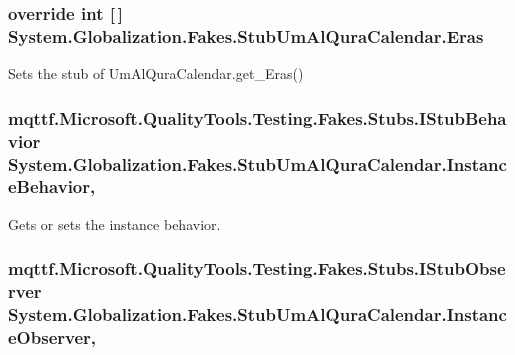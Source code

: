 \hypertarget{class_system_1_1_globalization_1_1_fakes_1_1_stub_um_al_qura_calendar_a76291ead9e535775a2084876057fe165}{
\subsubsection[{Eras}]{\setlength{\rightskip}{0pt plus 5cm}override int \mbox{[}$\,$\mbox{]} System.\-Globalization.\-Fakes.\-Stub\-Um\-Al\-Qura\-Calendar.\-Eras\hspace{0.3cm}{\ttfamily [get]}}}\label{class_system_1_1_globalization_1_1_fakes_1_1_stub_um_al_qura_calendar_a76291ead9e535775a2084876057fe165}


Sets the stub of Um\-Al\-Qura\-Calendar.\-get\-\_\-\-Eras()

\hypertarget{class_system_1_1_globalization_1_1_fakes_1_1_stub_um_al_qura_calendar_acab96834d402e150e91f18f103fd05d2}{
\subsubsection[{Instance\-Behavior}]{\setlength{\rightskip}{0pt plus 5cm}mqttf.\-Microsoft.\-Quality\-Tools.\-Testing.\-Fakes.\-Stubs.\-I\-Stub\-Behavior System.\-Globalization.\-Fakes.\-Stub\-Um\-Al\-Qura\-Calendar.\-Instance\-Behavior\hspace{0.3cm}{\ttfamily [get]}, {\ttfamily [set]}}}\label{class_system_1_1_globalization_1_1_fakes_1_1_stub_um_al_qura_calendar_acab96834d402e150e91f18f103fd05d2}


Gets or sets the instance behavior.

\hypertarget{class_system_1_1_globalization_1_1_fakes_1_1_stub_um_al_qura_calendar_aaeac9bee4b8be7bb39605f6272c69c87}{
\subsubsection[{Instance\-Observer}]{\setlength{\rightskip}{0pt plus 5cm}mqttf.\-Microsoft.\-Quality\-Tools.\-Testing.\-Fakes.\-Stubs.\-I\-Stub\-Observer System.\-Globalization.\-Fakes.\-Stub\-Um\-Al\-Qura\-Calendar.\-Instance\-Observer\hspace{0.3cm}{\ttfamily [get]}, {\ttfamily [set]}}}\label{class_system_1_1_globalization_1_1_fakes_1_1_stub_um_al_qura_calendar_aaeac9bee4b8be7bb39605f6272c69c87}


